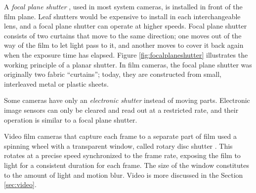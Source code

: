 A \emph{focal plane shutter} \cite{greenleaf1950photographic}, used in most system cameras, is installed in front of the film plane.
Leaf shutters would be expensive to install in each interchangeable lens, and a focal plane shutter can operate at higher speeds.
Focal plane shutter consists of two curtains that move to the same direction; one moves out of the way of the film to let light pass to it, and another moves to cover it back again when the exposure time has elapsed.
Figure \ref{fig:focalplaneshutter} illustrates the working principle of a planar shutter.
In film cameras, the focal plane shutter was originally two fabric ``curtains'';
today, they are constructed from small, interleaved metal or plastic sheets.

Some cameras have only an \emph{electronic shutter} instead of moving parts.
Electronic image sensors can only be cleared and read out at a restricted rate, and their operation is similar to a focal plane shutter.
\cite{caspeelectronic,kodakshutter}

Video film cameras that capture each frame to a separate part of film used a spinning wheel with a transparent window, called rotary disc shutter \cite{wilson2004anton}.
This rotates at a precise speed synchronized to the frame rate, exposing the film to light for a consistent duration for each frame.
The size of the window constitutes to the amount of light and motion blur.
Video is more discussed in the Section \ref{sec:video}.


